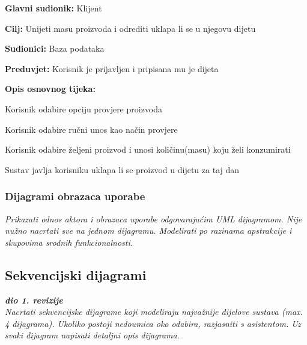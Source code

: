					\noindent {}
					\begin{packed_item}
						
						\item \textbf{Glavni sudionik:} Klijent
						\item  \textbf{Cilj:} Unijeti masu proizvoda i odrediti uklapa li se u njegovu dijetu
						\item  \textbf{Sudionici:} Baza podataka
						\item  \textbf{Preduvjet:} Korisnik je prijavljen i pripisana mu je dijeta
						\item  \textbf{Opis osnovnog tijeka:}
						
						\item[] \begin{packed_enum}
							
							\item Korisnik odabire opciju provjere proizvoda
							\item Korisnik odabire ručni unos kao način provjere
							\item Korisnik odabire željeni proizvod i unosi količinu(masu) koju želi konzumirati
							\item Sustav javlja korisniku uklapa li se proizvod u dijetu za taj dan
							
						\end{packed_enum}
						
						
					\end{packed_item}
				
					
					
				\subsubsection{Dijagrami obrazaca uporabe}
					
					\textit{Prikazati odnos aktora i obrazaca uporabe odgovarajućim UML dijagramom. Nije nužno nacrtati sve na jednom dijagramu. Modelirati po razinama apstrakcije i skupovima srodnih funkcionalnosti.}
				\eject		
				
			\subsection{Sekvencijski dijagrami}
				
				\textbf{\textit{dio 1. revizije}}\\
				
				\textit{Nacrtati sekvencijske dijagrame koji modeliraju najvažnije dijelove sustava (max. 4 dijagrama). Ukoliko postoji nedoumica oko odabira, razjasniti s asistentom. Uz svaki dijagram napisati detaljni opis dijagrama.}
				\eject
	

